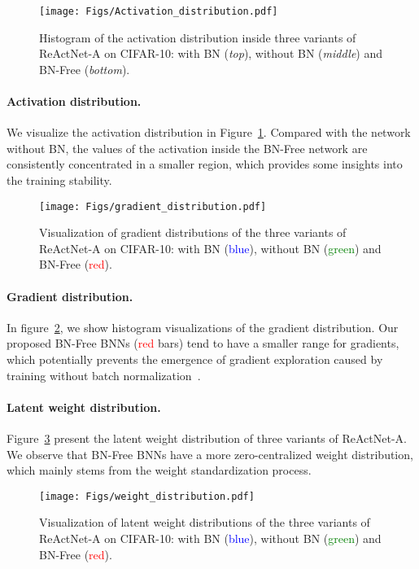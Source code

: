 \documentclass[final]{cvpr}
\begin{document}
\begin{figure}[htb]
    \centering
    \texttt{[image: Figs/Activation\_distribution.pdf]}
    \caption{Histogram of the activation distribution inside three variants of ReActNet-A on CIFAR-10: with BN (\textit{top}), without BN (\textit{middle}) and BN-Free (\textit{bottom}).}
    \label{fig:act_dis}
   \vspace{-2mm}
\end{figure}

\paragraph{Activation distribution.} We visualize the activation distribution in Figure~\ref{fig:act_dis}. Compared with the network without BN, the values of the activation inside the BN-Free network are consistently concentrated in a smaller region, which provides some insights into the training stability.

\begin{figure}[htb]
    \centering
    \texttt{[image: Figs/gradient\_distribution.pdf]}
    \caption{Visualization of gradient distributions of the three variants of ReActNet-A on CIFAR-10: with BN (\textcolor{blue}{blue}), without BN (\textcolor{green}{green}) and BN-Free (\textcolor{red}{red}).}
    \label{fig:grad}
  \vspace{-3mm}
\end{figure}

\paragraph{Gradient distribution.} In figure~\ref{fig:grad}, we show histogram visualizations of the gradient distribution. Our proposed BN-Free BNNs (\textcolor{red}{red} bars) tend to have a smaller range for gradients, which potentially prevents the emergence of gradient exploration caused by training without batch normalization~\cite{santurkar2018does}.

\paragraph{Latent weight distribution.} Figure~\ref{fig:weight} present the latent weight distribution of three variants of ReActNet-A. We observe that BN-Free BNNs have a more zero-centralized weight distribution, which mainly stems from the weight standardization process.  

\begin{figure}[t]
    \centering
    \texttt{[image: Figs/weight\_distribution.pdf]}
    \caption{Visualization of latent weight distributions of the three variants of ReActNet-A on CIFAR-10: with BN (\textcolor{blue}{blue}), without BN (\textcolor{green}{green}) and BN-Free (\textcolor{red}{red}).}
    \label{fig:weight}
    \vspace{-1.5mm}
\end{figure}
\end{document}
